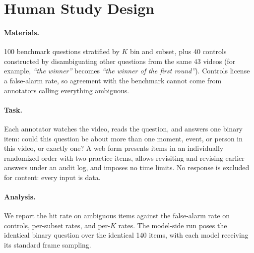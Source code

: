 \section{Human Study Design}
\label{app:humanstudy}

\paragraph{Materials.} 100 benchmark questions stratified by $K$ bin and subset, plus 40 controls constructed by disambiguating other questions from the same 43 videos (for example, \textit{``the winner''} becomes \textit{``the winner of the first round''}). Controls license a false-alarm rate, so agreement with the benchmark cannot come from annotators calling everything ambiguous.

\paragraph{Task.} Each annotator watches the video, reads the question, and answers one binary item: could this question be about more than one moment, event, or person in this video, or exactly one? A web form presents items in an individually randomized order with two practice items, allows revisiting and revising earlier answers under an audit log, and imposes no time limits. No response is excluded for content: every input is data.

\paragraph{Analysis.} We report the hit rate on ambiguous items against the false-alarm rate on controls, per-subset rates, and per-$K$ rates. The model-side run poses the identical binary question over the identical 140 items, with each model receiving its standard frame sampling.
